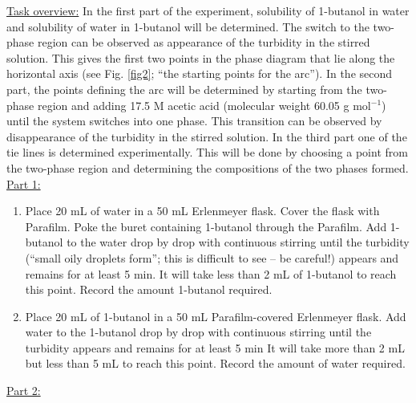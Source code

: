 \documentclass[byrevtex,amssymb,aps,pra,floatfix,letterpaper]{revtex4}
\begin{document}
\noindent
\underline{Task overview:} In the first part of the experiment, solubility of 1-butanol in water and solubility of water in 1-butanol will be determined. The switch to the two-phase region can be observed as appearance of the turbidity in the stirred solution. This gives the first two points in the phase diagram that lie along the horizontal axis (see Fig. \ref{fig2}; ``the starting points for the arc''). In the second part, the points defining the arc will be determined by
starting from the two-phase region and adding 17.5 M acetic acid (molecular weight 60.05 g mol$^{-1}$) until the system switches into one phase. This transition can be observed by disappearance of the turbidity in the stirred solution. In the third part one of the tie lines is determined experimentally. This will be done by choosing a point from the two-phase region and determining the compositions of the two phases formed.\\

\noindent
\underline{Part 1:}\\

\begin{enumerate}
\item Place 20 mL of water in a 50 mL Erlenmeyer flask. Cover the flask with Parafilm. Poke the buret containing 1-butanol through the Parafilm. Add 1-butanol to the water drop by drop with continuous stirring until the turbidity (``small oily droplets form''; this is difficult to see -- be careful!) appears and remains for at least 5 min. It will take less than 2 mL of 1-butanol to reach this point. Record the amount 1-butanol required.

\item Place 20 mL of 1-butanol in a 50 mL Parafilm-covered Erlenmeyer flask. Add water to the 1-butanol drop by drop with continuous stirring until the turbidity appears and remains for at least 5 min It will take more than 2 mL but less than 5 mL to reach this point. Record the amount of water required.

\end{enumerate}

\noindent
\underline{Part 2:}\\
\end{document}
